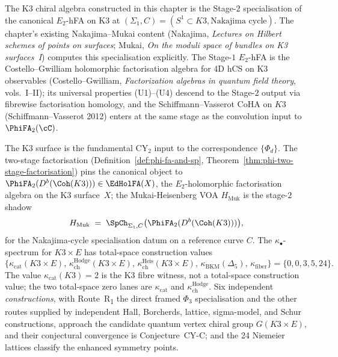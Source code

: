 \begin{remark}
\label{rem:k3ca-stage2-specialisation}
The K3 chiral algebra constructed in this chapter is the Stage-$2$ specialisation of the canonical $E_2$-hFA on K3 at $(\Sigma_1, C) = (S^1 \subset K3, \text{Nakajima cycle})$. The chapter's existing Nakajima--Mukai content (Nakajima, \emph{Lectures on Hilbert schemes of points on surfaces}; Mukai, \emph{On the moduli space of bundles on K3 surfaces~I}) computes this specialisation explicitly. The Stage-$1$ $E_2$-hFA is the Costello--Gwilliam holomorphic factorisation algebra for 4D hCS on K3 observables (Costello--Gwilliam, \emph{Factorization algebras in quantum field theory}, vols.~I--II); its universal properties (U1)--(U4) descend to the Stage-$2$ output via fibrewise factorisation homology, and the Schiffmann--Vasserot CoHA on $K3$ (Schiffmann--Vasserot 2012) enters at the same stage as the convolution input to $\PhiFA_2(\cC)$.
\end{remark}

The K3 surface is the fundamental CY$_2$ input to the correspondence $\{\Phi_d\}$.
The two-stage factorisation (Definition~\ref{def:phi-fa-and-sp}, Theorem~\ref{thm:phi-two-stage-factorisation}) pins the canonical object to $\PhiFA_2(D^b(\Coh(K3))) \in \EdHolFA(X)$, the $E_2$-holomorphic factorisation algebra on the K3 surface~$X$; the Mukai-Heisenberg VOA $H_{\mathrm{Muk}}$ is the stage-$2$ shadow
\[
 H_{\mathrm{Muk}} \;=\; \SpCh_{\Sigma_1, C}\bigl(\PhiFA_2(D^b(\Coh(K3)))\bigr),
\]
for the Nakajima-cycle specialisation datum on a reference curve $C$. The $\kappa_\bullet$-spectrum
for $K3\times E$ has total-space construction values
\[
 \{\kappa_{\mathrm{cat}}(K3\times E),\,
 \kappa_{\mathrm{ch}}^{\mathrm{Hodge}}(K3\times E),\,
 \kappa_{\mathrm{ch}}^{\mathrm{Heis}}(K3\times E),\,
 \kappa_{\mathrm{BKM}}(\Delta_5),\,
 \kappa_{\mathrm{fiber}}\}
 = \{0,0,3,5,24\}.
\]
The value \(\kappa_{\mathrm{cat}}(K3)=2\) is the K3 fibre witness, not a
total-space construction value; the two total-space zero lanes are
\(\kappa_{\mathrm{cat}}\) and \(\kappa_{\mathrm{ch}}^{\mathrm{Hodge}}\). Six independent
\emph{constructions}, with Route~R\textsubscript{1} the direct framed
\(\Phi_3\) specialisation and the other routes supplied by independent
Hall, Borcherds, lattice, sigma-model, and Schur constructions, approach
the candidate quantum vertex chiral group
$G(K3 \times E)$, and their
conjectural convergence is Conjecture~CY-C; and the 24 Niemeier lattices
classify the enhanced symmetry points.

